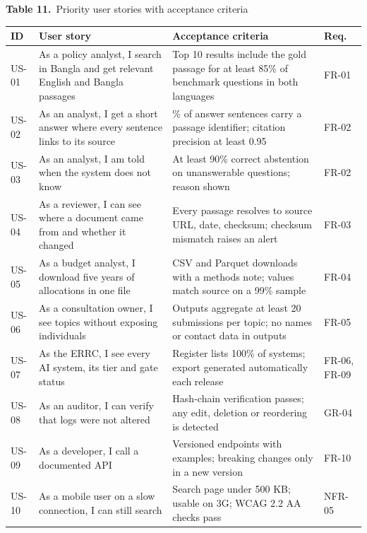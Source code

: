 \documentclass[border=10pt]{standalone}
\begin{document}
\begin{minipage}{17cm}
{\large\bfseries Table 11.}\ {\large Priority user stories with acceptance criteria}\par\vspace{7pt}
\small
{}
\begin{tabularx}{\linewidth}{@{}>{\hsize=0.333\hsize\raggedright\arraybackslash}X>{\hsize=1.619\hsize\raggedright\arraybackslash}X>{\hsize=1.619\hsize\raggedright\arraybackslash}X>{\hsize=0.429\hsize\raggedright\arraybackslash}X@{}}
\arrayrulecolor{bapilrule}\toprule
\rowcolor{white}\textbf{ID} & \textbf{User story} & \textbf{Acceptance criteria} & \textbf{Req.} \\
\midrule
US-01 & As a policy analyst, I search in Bangla and get relevant English and Bangla passages & Top 10 results include the gold passage for at least 85\% of benchmark questions in both languages & FR-01 \\
US-02 & As an analyst, I get a short answer where every sentence links to its source & 100\% of answer sentences carry a passage identifier; citation precision at least 0.95 & FR-02 \\
US-03 & As an analyst, I am told when the system does not know & At least 90\% correct abstention on unanswerable questions; reason shown & FR-02 \\
US-04 & As a reviewer, I can see where a document came from and whether it changed & Every passage resolves to source URL, date, checksum; checksum mismatch raises an alert & FR-03 \\
US-05 & As a budget analyst, I download five years of allocations in one file & CSV and Parquet downloads with a methods note; values match source on a 99\% sample & FR-04 \\
US-06 & As a consultation owner, I see topics without exposing individuals & Outputs aggregate at least 20 submissions per topic; no names or contact data in outputs & FR-05 \\
US-07 & As the ERRC, I see every AI system, its tier and gate status & Register lists 100\% of systems; export generated automatically each release & FR-06, FR-09 \\
US-08 & As an auditor, I can verify that logs were not altered & Hash-chain verification passes; any edit, deletion or reordering is detected & GR-04 \\
US-09 & As a developer, I call a documented API & Versioned endpoints with examples; breaking changes only in a new version & FR-10 \\
US-10 & As a mobile user on a slow connection, I can still search & Search page under 500 KB; usable on 3G; WCAG 2.2 AA checks pass & NFR-05 \\
\bottomrule
\end{tabularx}
\par{}
\end{minipage}
\end{document}
